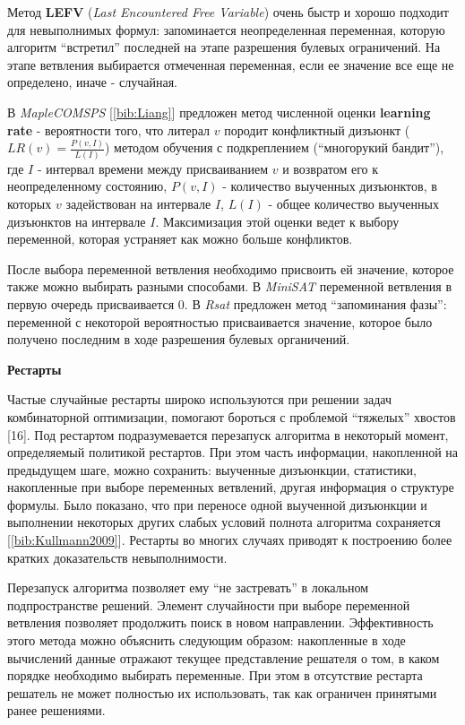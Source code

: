 Метод \textbf{LEFV} (\textit{Last Encountered Free Variable}) очень быстр и хорошо подходит для невыполнимых формул: запоминается неопределенная переменная, которую алгоритм \enquote{встретил} последней на этапе разрешения булевых ограничений. На этапе ветвления выбирается отмеченная переменная, если ее значение все еще не определено, иначе - случайная.

В \textit{MapleCOMSPS} [\ref{bib:Liang}] предложен метод численной оценки \textbf{learning rate} - вероятности того, 
что литерал $v$ породит конфликтный дизъюнкт ($LR(v) = \frac{P(v,I)}{L(I)}$) 
методом обучения с подкреплением (\enquote{многорукий бандит}), где 
$I$ - интервал времени между присваиванием $v$ и возвратом его к неопределенному состоянию, 
$P(v,I)$ - количество выученных дизъюнктов, в которых $v$ задействован на интервале $I$,
$L(I)$ - общее количество выученных дизъюнктов на интервале $I$. Максимизация этой оценки ведет к выбору переменной, которая устраняет как можно больше конфликтов.

После выбора переменной ветвления необходимо присвоить ей значение, которое также можно выбирать разными способами. В \textit{MiniSAT} переменной ветвления в первую очередь присваивается $0$. В \textit{Rsat} предложен метод \enquote{запоминания фазы}: переменной с некоторой вероятностью присваивается значение, которое было получено последним в ходе разрешения булевых органичений.

\newpage
\textbf{Рестарты}

Частые случайные рестарты широко используются при решении задач комбинаторной оптимизации, помогают бороться с проблемой \enquote{тяжелых} хвостов [16]. Под рестартом подразумевается перезапуск алгоритма в некоторый момент, определяемый политикой рестартов. При этом часть информации, накопленной на предыдущем шаге, можно сохранить: выученные дизъюнкции, статистики, накопленные при выборе переменных ветвлений, другая информация о структуре формулы. Было показано, что при переносе одной выученной дизъюнкции и выполнении некоторых других слабых условий полнота алгоритма сохраняется [\ref{bib:Kullmann2009}]. Рестарты во многих случаях приводят к построению более кратких доказательств невыполнимости.

Перезапуск алгоритма позволяет ему \enquote{не застревать} в локальном подпространстве решений. Элемент случайности при выборе переменной ветвления позволяет продолжить поиск в новом направлении. Эффективность этого метода можно объяснить следующим образом: накопленные в ходе вычислений данные отражают текущее представление решателя о том, в каком порядке необходимо выбирать переменные. При этом в отсутствие рестарта решатель не может полностью их использовать, так как ограничен принятыми ранее решениями.

